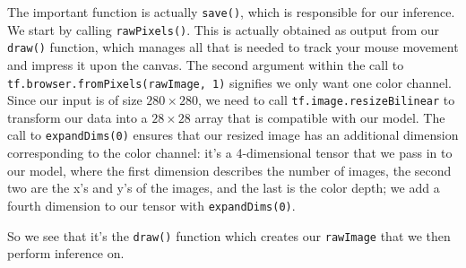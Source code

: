 \documentclass[12pt]{article}
\begin{document}
The important function is actually \texttt{save()}, which is responsible for our inference. We start by calling \texttt{rawPixels()}. This is actually obtained as output from our \texttt{draw()} function,
which manages all that is needed to track your mouse movement and impress it upon the canvas. 
The second argument within the call to \texttt{tf.browser.fromPixels(rawImage, 1)} signifies we only want one color channel. Since our input is of size $280 \times 280$, we need to call \texttt{tf.image.resizeBilinear} to transform our data into a $28 \times 28$ array that is compatible with our model. The call to \texttt{expandDims(0)} ensures that our resized image has an additional dimension corresponding to the color channel: it's a 4-dimensional tensor that we pass in to our model, where the first dimension describes the number of images, the second two are the x's and y's of the images, and the last is the color depth; we add a fourth dimension to our tensor with \texttt{expandDims(0)}. 


So we see that it's the \texttt{draw()} function which creates our \texttt{rawImage} that we then perform inference on.
\end{document}
